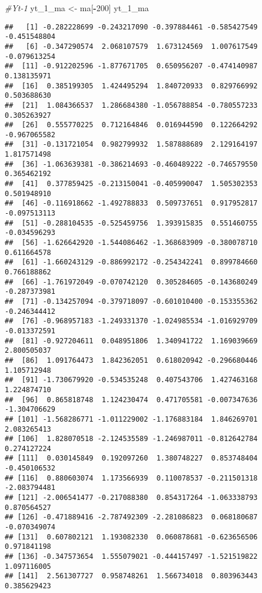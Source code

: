 \documentclass[
]{article}
\newenvironment{Shaded}{\begin{snugshade}}{\end{snugshade}}
\newcommand{\CommentTok}[1]{\textcolor[rgb]{0.56,0.35,0.01}{\textit{#1}}}
\newcommand{\DecValTok}[1]{\textcolor[rgb]{0.00,0.00,0.81}{#1}}
\newcommand{\NormalTok}[1]{#1}
\newcommand{\OtherTok}[1]{\textcolor[rgb]{0.56,0.35,0.01}{#1}}
\newcommand{\SpecialCharTok}[1]{\textcolor[rgb]{0.81,0.36,0.00}{\textbf{#1}}}
\begin{document}
\begin{Shaded}
\begin{Highlighting}[]
\CommentTok{\#Yt{-}1}
\NormalTok{yt\_1\_ma }\OtherTok{\textless{}{-}}\NormalTok{ ma[}\SpecialCharTok{{-}}\DecValTok{200}\NormalTok{]}
\NormalTok{yt\_1\_ma}
\end{Highlighting}
\end{Shaded}

\begin{verbatim}
##   [1] -0.282228699 -0.243217090 -0.397884461 -0.585427549 -0.451548804
##   [6] -0.347290574  2.068107579  1.673124569  1.007617549 -0.079613254
##  [11] -0.912202596 -1.877671705  0.650956207 -0.474140987  0.138135971
##  [16]  0.385199305  1.424495294  1.840720933  0.829766992  0.503688630
##  [21]  1.084366537  1.286684380 -1.056788854 -0.780557233  0.305263927
##  [26]  0.555770225  0.712164846  0.016944590  0.122664292 -0.967065582
##  [31] -0.131721054  0.982799932  1.587888689  2.129164197  1.817571498
##  [36] -1.063639381 -0.386214693 -0.460489222 -0.746579550  0.365462192
##  [41]  0.377859425 -0.213150041 -0.405990047  1.505302353  0.501948910
##  [46] -0.116918662 -1.492788833  0.509737651  0.917952817 -0.097513113
##  [51] -0.288104535 -0.525459756  1.393915835  0.551460755 -0.034596293
##  [56] -1.626642920 -1.544086462 -1.368683909 -0.380078710  0.611664578
##  [61] -1.660243129 -0.886992172 -0.254342241  0.899784660  0.766188862
##  [66] -1.761972049 -0.070742120  0.305284605 -0.143680249 -0.287373981
##  [71] -0.134257094 -0.379718097 -0.601010400 -0.153355362 -0.246344412
##  [76] -0.968957183 -1.249331370 -1.024985534 -1.016929709 -0.013372591
##  [81] -0.927204611  0.048951806  1.340941722  1.169039669  2.800505037
##  [86]  1.091764473  1.842362051  0.618020942 -0.296680446  1.105712948
##  [91] -1.730679920 -0.534535248  0.407543706  1.427463168  1.224874710
##  [96]  0.865818748  1.124230474  0.471705581 -0.007347636 -1.304706629
## [101] -1.568286771 -1.011229002 -1.176883184  1.846269701  2.083265413
## [106]  1.828070518 -2.124535589 -1.246987011 -0.812642784  0.274127224
## [111]  0.030145849  0.192097260  1.380748227  0.853748404 -0.450106532
## [116]  0.880603074  1.173566939  0.110078537 -0.211501318 -2.083794481
## [121] -2.006541477 -0.217088380  0.854317264 -1.063338793  0.870564527
## [126] -0.471889416 -2.787492309 -2.281086823  0.068180687 -0.070349074
## [131]  0.607802121  1.193082330  0.060878681 -0.623656506  0.971841198
## [136] -0.347573654  1.555079021 -0.444157497 -1.521519822  1.097116005
## [141]  2.561307727  0.958748261  1.566734018  0.803963443  0.385629423

\end{verbatim}
\end{document}
